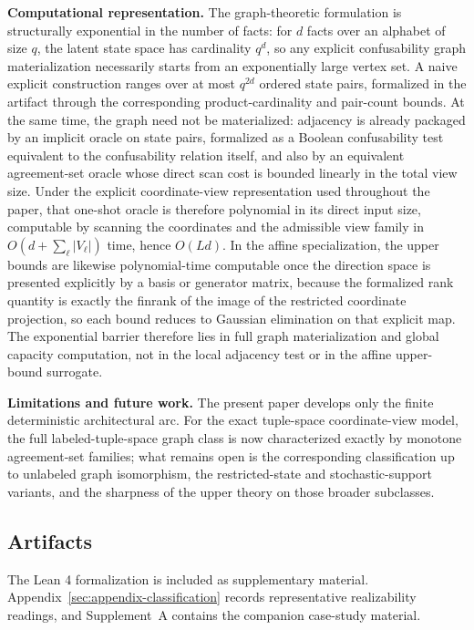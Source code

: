 \textbf{Computational representation.} The graph-theoretic formulation is structurally exponential in the number of facts: for $d$ facts over an alphabet of size $q$, the latent state space has cardinality $q^d$, so any explicit confusability graph materialization necessarily starts from an exponentially large vertex set. A naive explicit construction ranges over at most $q^{2d}$ ordered state pairs, formalized in the artifact through the corresponding product-cardinality and pair-count bounds. At the same time, the graph need not be materialized: adjacency is already packaged by an implicit oracle on state pairs, formalized as a Boolean confusability test equivalent to the confusability relation itself, and also by an equivalent agreement-set oracle whose direct scan cost is bounded linearly in the total view size. Under the explicit coordinate-view representation used throughout the paper, that one-shot oracle is therefore polynomial in its direct input size, computable by scanning the coordinates and the admissible view family in $O(d+\sum_{\ell}|V_\ell|)$ time, hence $O(Ld)$. In the affine specialization, the upper bounds are likewise polynomial-time computable once the direction space is presented explicitly by a basis or generator matrix, because the formalized rank quantity is exactly the finrank of the image of the restricted coordinate projection, so each bound reduces to Gaussian elimination on that explicit map. The exponential barrier therefore lies in full graph materialization and global capacity computation, not in the local adjacency test or in the affine upper-bound surrogate.

\textbf{Limitations and future work.} The present paper develops only the finite deterministic architectural arc. For the exact tuple-space coordinate-view model, the full labeled-tuple-space graph class is now characterized exactly by monotone agreement-set families; what remains open is the corresponding classification up to unlabeled graph isomorphism, the restricted-state and stochastic-support variants, and the sharpness of the upper theory on those broader subclasses.

\subsection{Artifacts}\label{sec:data-availability}

The Lean 4 formalization is included as supplementary material. Appendix~\ref{sec:appendix-classification} records representative realizability readings, and Supplement~A contains the companion case-study material.

